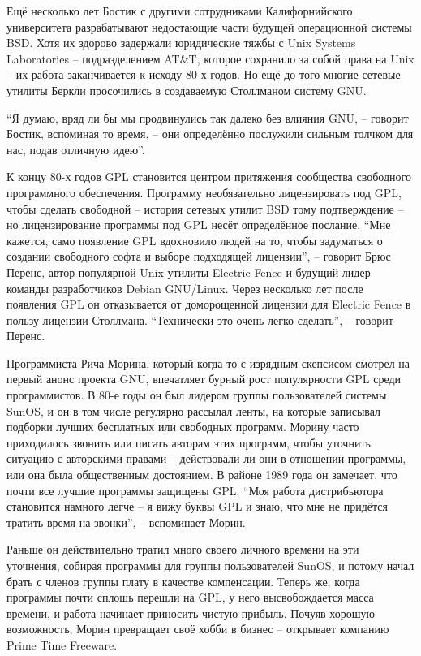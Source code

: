 Ещё несколько лет Бостик с другими сотрудниками Калифорнийского университета разрабатывают недостающие части будущей операционной системы BSD. Хотя их здорово задержали юридические тяжбы с Unix Systems Laboratories -- подразделением AT\&T, которое сохранило за собой права на Unix -- их работа заканчивается к исходу 80-х годов. Но ещё до того многие сетевые утилиты Беркли просочились в создаваемую Столлманом систему GNU.

\enquote{Я думаю, вряд ли бы мы продвинулись так далеко без влияния GNU, -- говорит Бостик, вспоминая то время, -- они определённо послужили сильным толчком для нас, подав отличную идею}.

К концу 80-х годов GPL становится центром притяжения сообщества свободного программного обеспечения. Программу необязательно лицензировать под GPL, чтобы сделать свободной -- история сетевых утилит BSD тому подтверждение -- но лицензирование программы под GPL несёт определённое послание. \enquote{Мне кажется, само появление GPL вдохновило людей на то, чтобы задуматься о создании свободного софта и выборе подходящей лицензии}, -- говорит Брюс Перенс, автор популярной Unix-утилиты Electric Fence и будущий лидер команды разработчиков Debian GNU/Linux. Через несколько лет после появления GPL он отказывается от доморощенной лицензии для Electric Fence в пользу лицензии Столлмана. \enquote{Технически это очень легко сделать}, -- говорит Перенс.

Программиста Рича Морина, который когда-то с изрядным скепсисом смотрел на первый анонс проекта GNU, впечатляет бурный рост популярности GPL среди программистов. В 80-е годы он был лидером группы пользователей системы SunOS, и он в том числе регулярно рассылал ленты, на которые записывал подборки лучших бесплатных или свободных программ. Морину часто приходилось звонить или писать авторам этих программ, чтобы уточнить ситуацию с авторскими правами -- действовали ли они в отношении программы, или она была общественным достоянием. В районе 1989 года он замечает, что почти все лучшие программы защищены GPL. \enquote{Моя работа дистрибьютора становится намного легче -- я вижу буквы GPL и знаю, что мне не придётся тратить время на звонки}, -- вспоминает Морин.

Раньше он действительно тратил много своего личного времени на эти уточнения, собирая программы для группы пользователей SunOS, и потому начал брать с членов группы плату в качестве компенсации. Теперь же, когда программы почти сплошь перешли на GPL, у него высвобождается масса времени, и работа начинает приносить чистую прибыль. Почуяв хорошую возможность, Морин превращает своё хобби в бизнес -- открывает компанию Prime Time Freeware.

